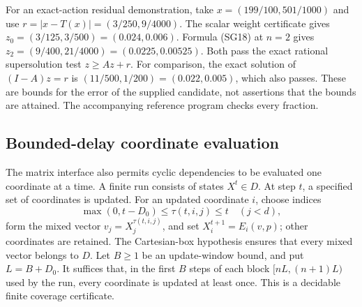 For an exact-action residual demonstration, take
$x=(199/100,501/1000)$ and use
$r=|x-T(x)|=(3/250,9/4000)$.  The scalar weight certificate gives
$z_0=(3/125,3/500)=(0.024,0.006)$.
Formula (SG18) at $n=2$ gives
$z_2=(9/400,21/4000)=(0.0225,0.00525)$.
Both pass the exact rational supersolution test $z\ge Az+r$.
For comparison, the exact solution of $(I-A)z=r$ is
$(11/500,1/200)=(0.022,0.005)$, which also passes.  These are bounds
for the error of the supplied candidate, not assertions that the bounds
are attained.  The accompanying reference program checks every fraction.

\subsection{Bounded-delay coordinate evaluation}
\label{sec:async-small-gain}

The matrix interface also permits cyclic dependencies to be evaluated one
coordinate at a time.  A finite run consists of states $X^t\in D$.
At step $t$, a specified set of coordinates is updated.  For an updated
coordinate $i$, choose indices
\[
 \max(0,t-D_0)\le\tau(t,i,j)\le t\quad(j<d),
\]
form the mixed vector $v_j=X^{\tau(t,i,j)}_j$, and set
$X^{t+1}_i=E_i(v,p)$; other coordinates are retained.
The Cartesian-box hypothesis ensures that every mixed vector belongs to
$D$.  Let $B\ge1$ be an update-window bound, and put $L=B+D_0$.
It suffices that, in the first $B$ steps of each block
$[nL,(n+1)L)$ used by the run, every coordinate is updated at least once.
This is a decidable finite coverage certificate.

